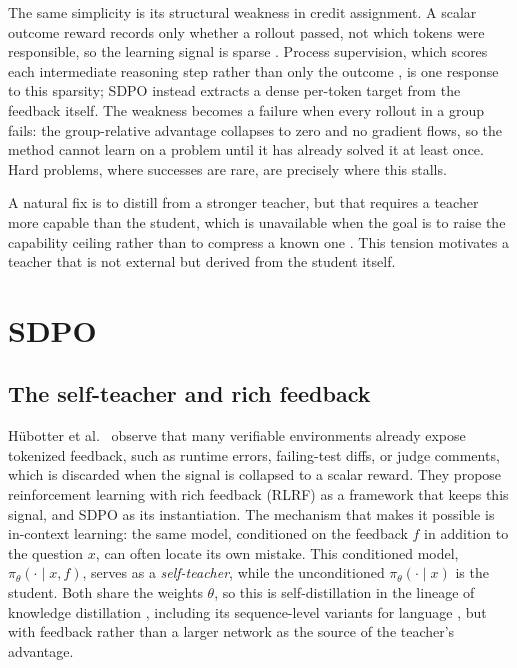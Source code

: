 \documentclass[12pt,a4paper]{report}
\begin{document}
The same simplicity is its structural weakness in credit assignment. A scalar outcome reward records only whether a rollout passed, not which tokens were responsible, so the learning signal is sparse \cite{r1}. Process supervision, which scores each intermediate reasoning step rather than only the outcome \cite{r22}, is one response to this sparsity; SDPO instead extracts a dense per-token target from the feedback itself. The weakness becomes a failure when every rollout in a group fails: the group-relative advantage collapses to zero and no gradient flows, so the method cannot learn on a problem until it has already solved it at least once. Hard problems, where successes are rare, are precisely where this stalls.

A natural fix is to distill from a stronger teacher, but that requires a teacher more capable than the student, which is unavailable when the goal is to raise the capability ceiling rather than to compress a known one \cite{r1}. This tension motivates a teacher that is not external but derived from the student itself.

\section{SDPO}\label{sdpo}

\subsection{The self-teacher and rich feedback}\label{the-self-teacher-and-rich-feedback}

Hübotter et al.~\cite{r1} observe that many verifiable environments already expose tokenized feedback, such as runtime errors, failing-test diffs, or judge comments, which is discarded when the signal is collapsed to a scalar reward. They propose reinforcement learning with rich feedback (RLRF) as a framework that keeps this signal, and SDPO as its instantiation. The mechanism that makes it possible is in-context learning: the same model, conditioned on the feedback \(f\) in addition to the question \(x\), can often locate its own mistake. This conditioned model, \(\pi_\theta(\cdot \mid x, f)\), serves as a \emph{self-teacher}, while the unconditioned \(\pi_\theta(\cdot \mid x)\) is the student. Both share the weights \(\theta\), so this is self-distillation in the lineage of knowledge distillation \cite{r13}, including its sequence-level variants for language \cite{r24}, but with feedback rather than a larger network as the source of the teacher's advantage.
\end{document}
